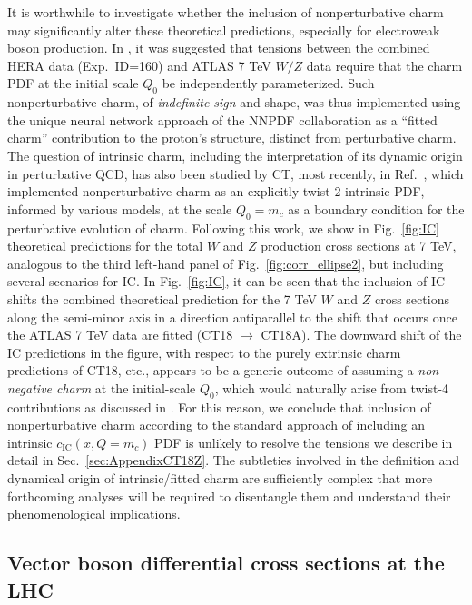It is worthwhile to investigate whether the inclusion of nonperturbative charm may significantly alter these theoretical predictions, especially for electroweak boson production.  In \cite{Ball:2017nwa}, it was suggested that tensions between the combined HERA data (Exp.~ID=160) and
ATLAS 7 TeV $W/Z$ data require that the charm PDF at the initial scale $Q_0$ be independently parameterized.  Such nonperturbative charm, of 
{\it indefinite sign} and shape, was thus implemented using the unique neural network approach of the NNPDF collaboration as a ``fitted charm'' contribution to the proton's structure, distinct from perturbative charm.  The question of intrinsic charm, including the interpretation of its dynamic origin in perturbative QCD, has also been studied by CT, most recently, in Ref.~\cite{Hou:2017khm}, which implemented nonperturbative charm as an explicitly twist-$2$ intrinsic PDF, informed by various models, at the scale $Q_0=m_c$ as a boundary condition for the perturbative evolution of charm.  Following this work, we show in Fig.~\ref{fig:IC} theoretical predictions for the total $W$ and $Z$ production cross sections at 7 TeV, analogous to the third left-hand panel of Fig.~\ref{fig:corr_ellipse2}, but including several scenarios for IC.  In Fig.~\ref{fig:IC}, it can be seen that the inclusion of IC shifts the combined theoretical prediction for the 7 TeV $W$ and $Z$ cross sections along the semi-minor axis in a direction antiparallel to the shift that occurs once the ATLAS 7 TeV data are fitted (CT18 $\to$ CT18A).  The downward shift of the IC predictions in the figure, with respect to the purely extrinsic charm predictions of CT18, etc., appears to be a generic outcome of assuming a {\it non-negative charm} at the initial-scale $Q_0$, which would naturally arise from twist-4 contributions as discussed in \cite{Hou:2017khm}. For this reason, we conclude that inclusion of nonperturbative charm according to the standard approach of including an intrinsic $c_\mathrm{IC}(x,Q=m_c)$ PDF is unlikely to resolve the tensions we describe in detail in Sec.~\ref{sec:AppendixCT18Z}. The subtleties involved in the definition and dynamical origin of intrinsic/fitted charm are sufficiently complex that more forthcoming analyses will be required
to disentangle them and understand their phenomenological implications.


\subsection{Vector boson differential cross sections at the LHC}
\label{sec:Res}


